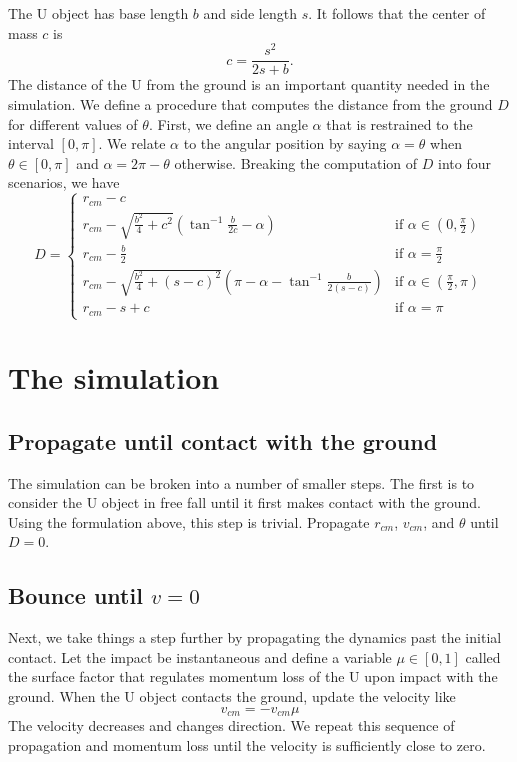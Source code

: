 \documentclass{article}
\begin{document}
The U object has base length $b$ and side length $s$. It follows that the center of mass $c$ is
\begin{equation}
    c = \frac{s^2}{2 s + b}.
\end{equation}
The distance of the U from the ground is an important quantity needed in the simulation. We define a procedure that computes the distance from the ground $D$ for different values of $\theta$. First, we define an angle $\alpha$ that is restrained to the interval $[0,\pi]$. We relate $\alpha$ to the angular position by saying $\alpha = \theta$ when $\theta \in [0,\pi]$ and $\alpha = 2 \pi - \theta$ otherwise. Breaking the computation of $D$ into four scenarios, we have 
\[
D = 
\begin{cases}
    r_{cm} - c \\
    r_{cm} - \sqrt{\frac{b^2}{4} + c^2} (\tan^{-1}{\frac{b}{2 c}} - \alpha) & \text{if $\alpha \in (0,\frac{\pi}{2})$} \\
    r_{cm} - \frac{b}{2} & \text{if $\alpha = \frac{\pi}{2}$} \\
    r_{cm} - \sqrt{\frac{b^2}{4} + (s - c)^2} (\pi - \alpha - \tan^{-1}{\frac{b}{2 (s - c)}}) & \text{if $\alpha \in (\frac{\pi}{2},\pi)$} \\
    r_{cm} - s + c & \text{if $\alpha = \pi$}
\end{cases}
\]

\section{The simulation}
\setcounter{equation}{0}

\subsection{Propagate until contact with the ground}
The simulation can be broken into a number of smaller steps. The first is to consider the U object in free fall until it first makes contact with the ground. Using the formulation above, this step is trivial. Propagate $r_{cm}$, $v_{cm}$, and $\theta$ until $D = 0$.

\subsection{Bounce until $v = 0$}
Next, we take things a step further by propagating the dynamics past the initial contact. Let the impact be instantaneous and define a variable $\mu \in [0,1]$ called the surface factor that regulates momentum loss of the U upon impact with the ground. When the U object contacts the ground, update the velocity like
\begin{equation}
    v_{cm} = - v_{cm} \mu
\end{equation}
The velocity decreases and changes direction. We repeat this sequence of propagation and momentum loss until the velocity is sufficiently close to zero.
\end{document}
